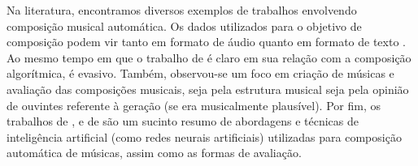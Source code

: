 \documentclass{automatextcc}
\begin{document}
Na literatura, encontramos diversos exemplos de trabalhos envolvendo composição musical automática. Os dados utilizados para o objetivo de composição podem vir tanto em formato de áudio \citep[como o de][]{kuang2021} quanto em formato de texto \citep[como o de][]{agarwala2017}. Ao mesmo tempo em que o trabalho de \citet{colombo2016} é claro em sua relação com a composição algorítmica, \citet{souza2018} é evasivo. Também, observou-se um foco em criação de músicas e avaliação das composições musicais, seja pela estrutura musical seja pela opinião de ouvintes referente à geração (se era musicalmente plausível). Por fim, os trabalhos de \citet{fernandez2013}, \citet{ji2020} e de \citet{olivan2021} são um sucinto resumo de abordagens e técnicas de inteligência artificial (como redes neurais artificiais) utilizadas para composição automática de músicas, assim como as formas de avaliação. 



\end{document}
